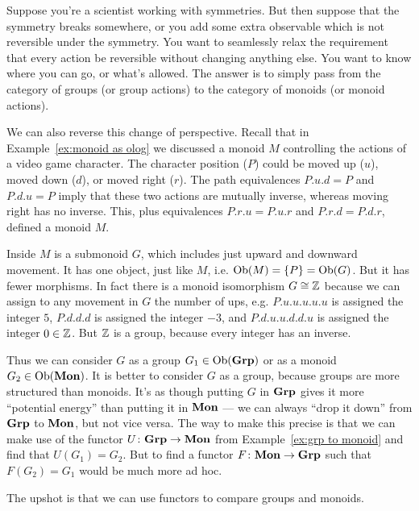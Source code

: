 \documentclass[CT4S-EN-RU]{subfiles}
\begin{document}
\begin{sloganRUS}
\end{sloganRUS}

\begin{applicationENG}
Suppose you're a scientist working with symmetries. But then suppose that the symmetry breaks somewhere, or you add some extra observable which is not reversible under the symmetry. You want to seamlessly relax the requirement that every action be reversible without changing anything else. You want to know where you can go, or what's allowed. The answer is to simply pass from the category of groups (or group actions) to the category of monoids (or monoid actions). 

We can also reverse this change of perspective. Recall that in Example~\ref{ex:monoid as olog} we discussed a monoid $M$ controlling the actions of a video game character. The character position ($P$) could be moved up ($u$), moved down ($d$), or moved right ($r$). The path equivalences $P.u.d=P$ and $P.d.u=P$ imply that these two actions are mutually inverse, whereas moving right has no inverse. This, plus equivalences $P.r.u=P.u.r$ and $P.r.d=P.d.r$, defined a monoid $M$. 

Inside $M$ is a submonoid $G$, which includes just upward and downward movement. It has one object, just like $M$, i.e. $\textnormal{Ob}(M)=\{P\}=\textnormal{Ob}(G)$. But it has fewer morphisms. In fact there is a monoid isomorphism $G\cong{\mathbb Z}$ because we can assign to any movement in $G$ the number of ups, e.g. $P.u.u.u.u.u$ is assigned the integer $5$, $P.d.d.d$ is assigned the integer $-3$, and $P.d.u.u.d.d.u$ is assigned the integer $0\in{\mathbb Z}$. But ${\mathbb Z}$ is a group, because every integer has an inverse.

Thus we can consider $G$ as a group $G_1\in\textnormal{Ob}({\mathbf{Grp}})$ or as a monoid $G_2\in\textnormal{Ob}({\mathbf{Mon}})$. It is better to consider $G$ as a group, because groups are more structured than monoids. It's as though putting $G$ in ${\mathbf{Grp}}$ gives it more “potential energy” than putting it in ${\mathbf{Mon}}$ — we can always “drop it down” from ${\mathbf{Grp}}$ to ${\mathbf{Mon}}$, but not vice versa. The way to make this precise is that we can make use of the functor $U\colon{\mathbf{Grp}}\rightarrow{\mathbf{Mon}}$ from Example~\ref{ex:grp to monoid} and find that $U(G_1)=G_2$. But to find a functor $F\colon{\mathbf{Mon}}\rightarrow{\mathbf{Grp}}$ such that $F(G_2)=G_1$ would be much more ad hoc. 

The upshot is that we can use functors to compare groups and monoids.
\end{applicationENG}

\begin{applicationRUS}
\end{applicationRUS}
\end{document}
